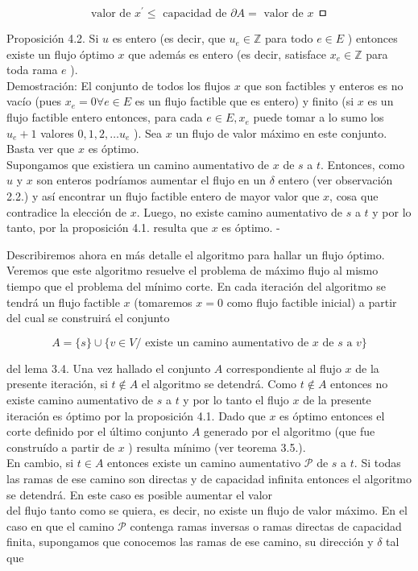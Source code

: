 \documentclass[10pt]{article}
\begin{document}
$$
\text { valor de } x^{\prime} \leq \text { capacidad de } \partial A=\text { valor de } x \text { ㅁ }
$$

Proposición 4.2. Si $u$ es entero (es decir, que $u_{e} \in \mathbb{Z}$ para todo $e \in E$ ) entonces existe un flujo óptimo $x$ que además es entero (es decir, satisface $x_{e} \in \mathbb{Z}$ para toda rama $e$ ).\\
Demostración: El conjunto de todos los flujos $x$ que son factibles y enteros es no vacío (pues $x_{e}=0 \forall e \in E$ es un flujo factible que es entero) y finito (si $x$ es un flujo factible entero entonces, para cada $e \in E, x_{e}$ puede tomar a lo sumo los $u_{e}+1$ valores $0,1,2, \ldots u_{e}$ ). Sea $x$ un flujo de valor máximo en este conjunto. Basta ver que $x$ es óptimo.\\
Supongamos que existiera un camino aumentativo de $x$ de $s$ a $t$. Entonces, como $u$ y $x$ son enteros podríamos aumentar el flujo en un $\delta$ entero (ver observación 2.2.) y así encontrar un flujo factible entero de mayor valor que $x$, cosa que contradice la elección de $x$. Luego, no existe camino aumentativo de $s$ a $t$ y por lo tanto, por la proposición 4.1. resulta que $x$ es óptimo. -

Describiremos ahora en más detalle el algoritmo para hallar un flujo óptimo. Veremos que este algoritmo resuelve el problema de máximo flujo al mismo tiempo que el problema del mínimo corte. En cada iteración del algoritmo se tendrá un flujo factible $x$ (tomaremos $x=0$ como flujo factible inicial) a partir del cual se construirá el conjunto

$$
A=\{s\} \cup\{v \in V / \text { existe un camino aumentativo de } x \text { de } s \text { a } v\}
$$

del lema 3.4. Una vez hallado el conjunto $A$ correspondiente al flujo $x$ de la presente iteración, si $t \notin A$ el algoritmo se detendrá. Como $t \notin A$ entonces no existe camino aumentativo de $s$ a $t$ y por lo tanto el flujo $x$ de la presente iteración es óptimo por la proposición 4.1. Dado que $x$ es óptimo entonces el corte definido por el último conjunto $A$ generado por el algoritmo (que fue construído a partir de $x$ ) resulta mínimo (ver teorema 3.5.).\\
En cambio, si $t \in A$ entonces existe un camino aumentativo $\mathcal{P}$ de $s$ a $t$. Si todas las ramas de ese camino son directas y de capacidad infinita entonces el algoritmo se detendrá. En este caso es posible aumentar el valor\\
del flujo tanto como se quiera, es decir, no existe un flujo de valor máximo. En el caso en que el camino $\mathcal{P}$ contenga ramas inversas o ramas directas de capacidad finita, supongamos que conocemos las ramas de ese camino, su dirección y $\delta$ tal que
\end{document}
